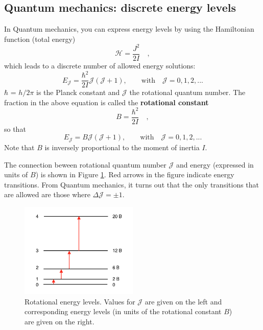 \subsection{Quantum mechanics: discrete energy levels}

In Quantum mechanics, you can express energy levels by using the Hamiltonian function (total energy)
\begin{equation}
\mathcal{H}=\frac{J^2}{2I} \quad ,
\end{equation}
which leads to a discrete number of allowed energy solutions:
\begin{equation}
E_\mathcal{J} = \frac{\hbar^2}{2I} \mathcal{J}(\mathcal{J}+1), \qquad \text{with} \quad \mathcal{J} = 0, 1, 2, ...
\end{equation}
$\hbar$ = $h/2\pi$ is the Planck constant and $\mathcal{J}$ the
rotational quantum number. The fraction in the above equation is
called the \textbf{rotational constant} 
\begin{equation}
  B = \frac{\hbar^2}{2I} \quad  ,
\end{equation}
so that
\begin{equation}
E_\mathcal{J} = B \mathcal{J}(\mathcal{J}+1), \qquad \text{with} \quad \mathcal{J} = 0, 1, 2, ...
\end{equation}
Note that $B$ is inversely proportional to the moment of inertia $I$.

The connection beween rotational quantum number $\mathcal{J}$ and
energy (expressed in units of $B$) is shown in Figure
\ref{fig:energy_levels}. Red arrows in the figure indicate energy
transitions.  From Quantum mechanics, it turns out that the only
transitions that are allowed are those where
$\Delta \mathcal{J} = \pm1$. 

\begin{figure}
\begin{center}
\includegraphics[width=0.5\textwidth]{figures/Energy_levels}
\caption{Rotational energy levels. Values for $\mathcal{J}$ are given on the left and corresponding energy
  levels (in units of the rotational constant $B$) are given on the right.}
\label{fig:energy_levels}
\end{center}
\end{figure}

